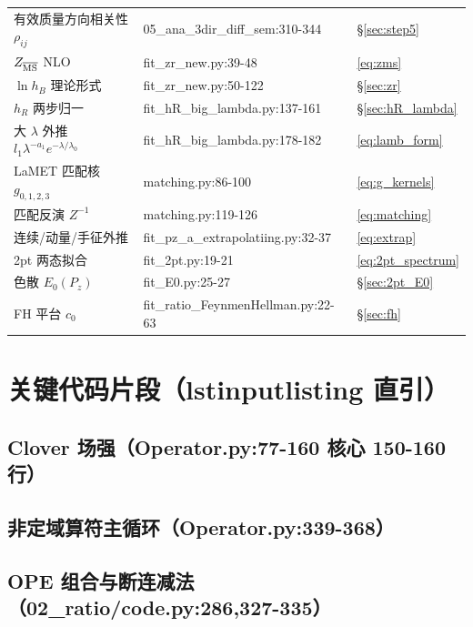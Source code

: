\documentclass[UTF8,11pt]{ctexart}
\begin{document}
\begin{table}[h]
\begin{tabular}{@{}lll@{}}
有效质量方向相关性 $\rho_{ij}$ & 05\_ana\_3dir\_diff\_sem:310-344 & \S\ref{sec:step5} \\
$Z_{\overline{\rm MS}}$ NLO & fit\_zr\_new.py:39-48 & \eqref{eq:zms} \\
$\ln h_B$ 理论形式 & fit\_zr\_new.py:50-122 & \S\ref{sec:zr} \\
$h_R$ 两步归一 & fit\_hR\_big\_lambda.py:137-161 & \S\ref{sec:hR_lambda} \\
大 $\lambda$ 外推 $l_1\lambda^{-a_1}e^{-\lambda/\lambda_0}$ & fit\_hR\_big\_lambda.py:178-182 & \eqref{eq:lamb_form} \\
LaMET 匹配核 $g_{0,1,2,3}$ & matching.py:86-100 & \eqref{eq:g_kernels} \\
匹配反演 $Z^{-1}$ & matching.py:119-126 & \eqref{eq:matching} \\
连续/动量/手征外推 & fit\_pz\_a\_extrapolatiing.py:32-37 & \eqref{eq:extrap} \\
2pt 两态拟合 & fit\_2pt.py:19-21 & \eqref{eq:2pt_spectrum} \\
色散 $E_0(P_z)$ & fit\_E0.py:25-27 & \S\ref{sec:2pt_E0} \\
FH 平台 $c_0$ & fit\_ratio\_FeynmenHellman.py:22-63 & \S\ref{sec:fh} \\
\bottomrule
\end{tabular}
\end{table}

\section{关键代码片段（lstinputlisting 直引）}
\label{sec:listings}

\subsection{Clover 场强（Operator.py:77-160 核心 150-160 行）}


\subsection{非定域算符主循环（Operator.py:339-368）}


\subsection{OPE 组合与断连减法（02\_ratio/code.py:286,327-335）}

\end{document}
